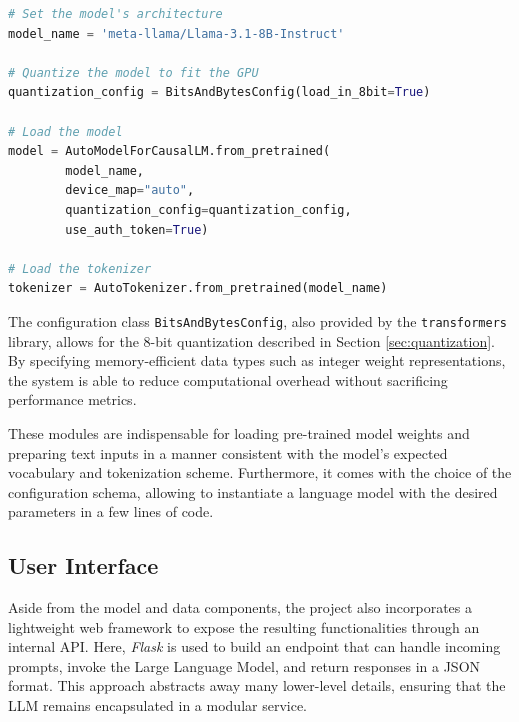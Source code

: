 \begin{center}
\begin{lstlisting}[language=Python, frame=single, caption=Importing LLaMa through Transformers Library, label=lst:transformers-script]
# Set the model's architecture
model_name = 'meta-llama/Llama-3.1-8B-Instruct'

# Quantize the model to fit the GPU
quantization_config = BitsAndBytesConfig(load_in_8bit=True)
    
# Load the model
model = AutoModelForCausalLM.from_pretrained(
        model_name,
        device_map="auto",
        quantization_config=quantization_config,
        use_auth_token=True)

# Load the tokenizer
tokenizer = AutoTokenizer.from_pretrained(model_name)
\end{lstlisting}
\end{center}

The configuration class \verb|BitsAndBytesConfig|, also provided by the \verb|transformers| library, allows for the 8-bit quantization described in Section \ref{sec:quantization}. By specifying memory-efficient data types such as integer weight representations, the system is able to reduce computational overhead without sacrificing performance metrics.

These modules are indispensable for loading pre-trained model weights and preparing text inputs in a manner consistent with the model’s expected vocabulary and tokenization scheme. Furthermore, it comes with the choice of the configuration schema, allowing to instantiate a language model with the desired parameters in a few lines of code.


\subsection{User Interface}
\label{sec:user-interface}

Aside from the model and data components, the project also incorporates a lightweight web framework to expose the resulting functionalities through an internal API. Here, \textit{Flask} is used to build an endpoint that can handle incoming prompts, invoke the Large Language Model, and return responses in a JSON format. This approach abstracts away many lower-level details, ensuring that the LLM remains encapsulated in a modular service.

